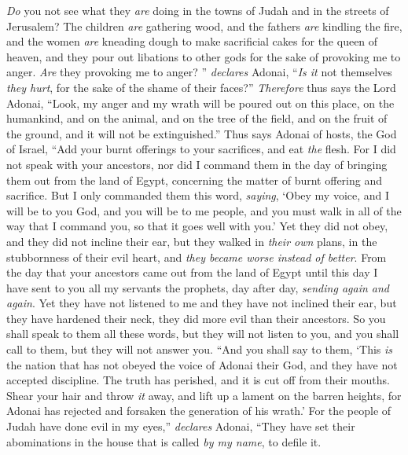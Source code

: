 \begin{biblechapter}
\verse \textit{Do} you not see what they \textit{are} doing in the towns of Judah and in the streets of Jerusalem?
\verse The children \textit{are} gathering wood, and the fathers \textit{are} kindling the fire, and the women \textit{are} kneading dough to make sacrificial cakes for the queen of heaven, and they pour out libations to other gods for the sake of provoking me to anger.
\verse \textit{Are} they provoking me to anger? ” \textit{declares} Adonai, “\textit{Is it} not themselves \textit{they hurt}, for the sake of the shame of their faces?”
\verse \textit{Therefore} thus says the Lord Adonai, “Look, my anger and my wrath will be poured out on this place, on the humankind, and on the animal, and on the tree of the field, and on the fruit of the ground, and it will not be extinguished.”
\verse Thus says Adonai of hosts, the God of Israel, “Add your burnt offerings to your sacrifices, and eat \textit{the} flesh.
\verse For I did not speak with your ancestors, nor did I command them in the day of bringing them out from the land of Egypt, concerning the matter of burnt offering and sacrifice.
\verse But I only commanded them this word, \textit{saying}, ‘Obey my voice, and I will be to you God, and you will be to me people, and you must walk in all of the way that I command you, so that it goes well with you.’
\verse Yet they did not obey, and they did not incline their ear, but they walked in \textit{their own} plans, in the stubbornness of their evil heart, and \textit{they became worse instead of better}.
\verse From the day that your ancestors came out from the land of Egypt until this day I have sent to you all my servants the prophets, day after day, \textit{sending again and again}.
\verse Yet they have not listened to me and they have not inclined their ear, but they have hardened their neck, they did more evil than their ancestors.
\verse So you shall speak to them all these words, but they will not listen to you, and you shall call to them, but they will not answer you.
 “And you shall say to them, ‘This \textit{is} the nation that has not obeyed the voice of Adonai their God, and they have not accepted discipline. The truth has perished, and it is cut off from their mouths.
\verse Shear your hair and throw \textit{it} away, and lift up a lament on the barren heights, for Adonai has rejected and forsaken the generation of his wrath.’
\verse For the people  of Judah have done evil in my eyes,” \textit{declares} Adonai, “They have set their abominations in the house that is called \textit{by my name}, to defile it.

\end{biblechapter}
